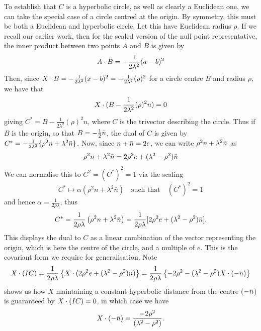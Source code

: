 To establish that $C$ is a hyperbolic circle, as well as
clearly a Euclidean one, we can take the special case of a circle
centred at the origin. By symmetry, this must be both a Euclidean
and hyperbolic circle. Let this have Euclidean radius $\rho$.
If we recall our earlier work, then for the scaled version of the
null point representative, the inner product between two points
$A$ and $B$ is given by
%
\begin{equation}
     A\cdot B = -\frac{1}{2\lambda^2}(a-b)^2
     \end{equation}
%
Then, since $X\cdot B = -\frac{1}{2\lambda^2}(x-b)^2 =
-\frac{1}{2\lambda^2}(\rho)^2$ for a circle centre $B$ and radius
$\rho$, we have that
%
\begin{equation}
  X\cdot (B-\frac{1}{2\lambda^2}(\rho)^2n)=0
\end{equation}
%
giving $C^*=B-\frac{1}{2\lambda^2}(\rho)^2n$, where $C$ is the
trivector describing the circle. Thus if $B$ is the origin, so
that $B = -\frac{1}{2}\bar{n}$, the dual of $C$ is given by $C^* =
-\frac{1}{2\lambda^2}\{\rho^2 n + \lambda^2\bar{n}\}$. Now, since
$n+\bar{n} = 2e$, we can write $\rho^2 n + \lambda^2\bar{n}$ as
%
\begin{equation} \label{eqn:dual-to-C}
\rho^2 n + \lambda^2 \bar{n} = 2 \rho^2 e + (\lambda^2 -
\rho^2) \bar{n}
\end{equation}
%
We can normalise this to $C^2=(C^{*})^2=1$ via the scaling
\[C^* \mapsto \alpha(\rho^2n + \lambda^2\bar{n})\quad\mbox{such that}
\quad(C^{*})^2 = 1
\]
and hence $\alpha = \frac{1}{2\rho\lambda}$, thus
\begin{equation}
C^* = \frac{1}{2 \rho \lambda} \left(\rho^2 n + \lambda^2 
\bar{n}\right)
		=
\frac{1}{2\rho\lambda}[2\rho^2e + (\lambda^2 - \rho^2)\bar{n}].
\end{equation}
%
This displays the dual to $C$ as a linear combination of
the vector representing the origin, which is here the
centre of the circle, and a multiple of $e$. This is the
covariant form we require for generalisation. Note
%
%
\begin{equation}
X \cdot (IC) = \frac{1}{2 \rho \lambda} \left\{ X \cdot (2 \rho^2 e +
(\lambda^2 - \rho^2) \bar{n}) \right\} = \frac{1}{2 \rho \lambda}
\left\{ -2\rho^2 -(\lambda^2-\rho^2) X \cdot (-\bar{n}) \right\}
\end{equation}
%
shows us how $X$ maintaining a constant hyperbolic distance
from the centre ($-\bar{n}$) is guaranteed by $X \cdot (IC)=0$, in which
case we have
%
\begin{equation}
X \cdot (-\bar{n}) = \frac{-2\rho^2}{(\lambda^2 - \rho^2)}.
\end{equation}
